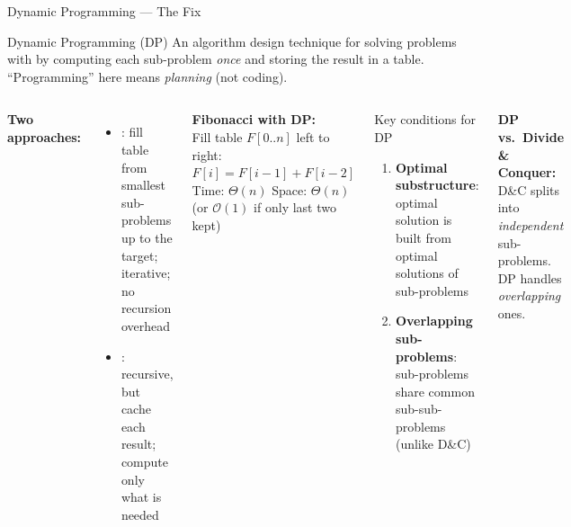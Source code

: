 \documentclass[aspectratio=169]{beamer}
\begin{document}
\begin{frame}[shrink=12]{Dynamic Programming — The Fix}
  \begin{block}{Dynamic Programming (DP)}
    An algorithm design technique for solving problems with
     by computing each sub-problem
    \emph{once} and storing the result in a table.
    ``Programming'' here means \emph{planning} (not coding).
  \end{block}
  \vspace{0.4em}
  \begin{columns}[T]
      \textbf{Two approaches:}
      \begin{itemize}
        \item {}: fill table from smallest
              sub-problems up to the target; iterative; no recursion overhead
        \item {}: recursive, but cache
              each result; compute only what is needed
      \end{itemize}
      \vspace{0.3em}
      \textbf{Fibonacci with DP:}\\
      Fill table $F[0..n]$ left to right: $F[i] = F[i{-}1] + F[i{-}2]$\\
      Time: $\Theta(n)$ \quad Space: $\Theta(n)$ (or $\mathcal{O}(1)$ if only last two kept)
      \begin{exampleblock}{Key conditions for DP}
        \begin{enumerate}
          \item \textbf{Optimal substructure}: optimal solution
                is built from optimal solutions of sub-problems
          \item \textbf{Overlapping sub-problems}: sub-problems
                share common sub-sub-problems (unlike D\&C)
        \end{enumerate}
      \end{exampleblock}
      \vspace{0.3em}
      \textbf{DP vs.\ Divide \& Conquer:}\\
      D\&C splits into \emph{independent} sub-problems.\\
      DP handles \emph{overlapping} ones.
  \end{columns}
\end{frame}

\end{document}
